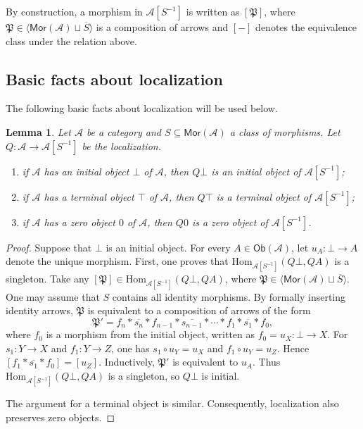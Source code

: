 \documentclass[10pt,a4paper]{amsart}
\theoremstyle{plain}
\newtheorem{lemma}[theorem]{Lemma}
\theoremstyle{definition}
\theoremstyle{remark}
\begin{document}
By construction, a morphism in $\mathcal{A}[S^{-1}]$ is written as $[\mathfrak P]$, where $\mathfrak P \in \langle \mathsf{Mor} (\mathcal{A}) \sqcup \overline S \rangle$ is a composition of arrows and $[-]$ denotes the equivalence class under the relation above.

\subsection{Basic facts about localization}

The following basic facts about localization will be used below.

\begin{lemma}\label{lem:nullary-preservation}
  Let $\mathcal{A}$ be a category and $S \subseteq \mathsf{Mor}(\mathcal{A})$ a class of morphisms.
  Let $Q:\mathcal A\longrightarrow \mathcal A[S^{-1}]$ be the localization.
  \begin{enumerate}[label=\textup{(\arabic*)}]
    \item if $\mathcal{A}$ has an initial object $\bot$ of $\mathcal A$, then $Q\bot$ is an initial object of $\mathcal A[S^{-1}]$;
    \item if $\mathcal{A}$ has a terminal object $\top$ of $\mathcal A$, then $Q\top$ is a terminal object of $\mathcal A[S^{-1}]$;
    \item if $\mathcal{A}$ has a zero object $0$ of $\mathcal A$, then $Q0$ is a zero object of $\mathcal A[S^{-1}]$.
  \end{enumerate}
\end{lemma}

\begin{proof}
  Suppose that $\bot$ is an initial object.
  For every $A\in\mathsf{Ob}(\mathcal A)$, let $u_A:\bot\longrightarrow A$ denote the unique morphism.
  First, one proves that $\mathrm{Hom}_{\mathcal A[S^{-1}]}(Q\bot,QA)$ is a singleton.
  Take any $[\mathfrak P] \in \mathrm{Hom}_{\mathcal A[S^{-1}]}(Q\bot,QA)$, where $\mathfrak P \in \langle \mathsf{Mor} (\mathcal{A}) \sqcup \overline S \rangle$.
  One may assume that $S$ contains all identity morphisms.
  By formally inserting identity arrows, $\mathfrak P$ is equivalent to a composition of arrows of the form
  \[
    \mathfrak P' = f_n \ast \overline {s_n} \ast f_{n-1} \ast \overline{s_{n-1}} \ast \cdots \ast f_1 \ast \overline{s_1} \ast f_0,
  \]
  where $f_0$ is a morphism from the initial object, written as $f_0 = u_X : \bot \longrightarrow X$.
  For $s_1 : Y \longrightarrow X$ and $f_1 : Y \longrightarrow Z$, one has $s_1 \circ u_Y = u_X$ and $f_1 \circ u_Y = u_Z$.
  Hence $[f_1 \ast \overline{s_1} \ast f_0] = [u_Z]$.
  Inductively, $\mathfrak P'$ is equivalent to $u_A$.
  Thus $\mathrm{Hom}_{\mathcal A[S^{-1}]}(Q\bot,QA)$ is a singleton, so $Q \bot$ is initial.

  \medskip

  The argument for a terminal object is similar.
  Consequently, localization also preserves zero objects.
\end{proof}
\end{document}
